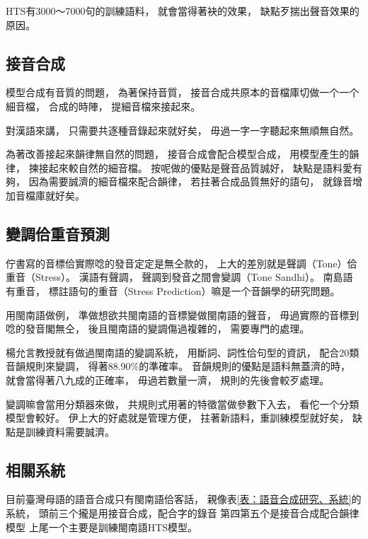 HTS有3000～7000句的訓練語料，
就會當得著袂的效果，
缺點歹揣出聲音效果的原因。


\subsection{接音合成}
\label{小節：接音合成}
模型合成有音質的問題，
為著保持音質，
接音合成共原本的音檔庫切做一个一个細音檔，
合成的時陣，
提細音檔來接起來。

對漢語來講，
只需要共逐種音錄起來就好矣，
毋過一字一字聽起來無順無自然。

為著改善接起來韻律無自然的問題，
接音合成會配合模型合成，
用模型產生的韻律，
揀接起來較自然的細音檔。
按呢做的優點是聲音品質誠好，
缺點是語料愛有夠，
因為需要誠濟的細音檔來配合韻律，
若拄著合成品質無好的語句，
就錄音增加音檔庫就好矣。

\subsection{變調佮重音預測}
\label{小節：變調佮重音預測}
佇書寫的音標佮實際唸的發音定定是無仝款的，
上大的差別就是聲調（Tone）佮重音（Stress）。
漢語有聲調，
聲調到發音之間會變調（Tone Sandhi）。
南島語有重音，
標註語句的重音（Stress Prediction）嘛是一个音韻學的研究問題。

用閩南語做例，
準做想欲共閩南語的音標變做閩南語的聲音，
毋過實際的音標到唸的發音閣無仝，
後且閩南語的變調傷過複雜的，
需要專門的處理。

楊允言教授就有做過閩南語的變調系統\cite{iunn:台語變調系統實作研究}，
用斷詞、詞性佮句型的資訊，
配合20類音韻規則來變調，
得著88.90\%的準確率。
音韻規則的優點是語料無蓋濟的時，
就會當得著八九成的正確率，
毋過若數量一濟，
規則的先後會較歹處理。

變調嘛會當用分類器來做，
共規則式用著的特徵當做參數下入去，
看佗一个分類模型會較好。
伊上大的好處就是管理方便，
拄著新語料，重訓練模型就好矣，
缺點是訓練資料需要誠濟。

\subsection{相關系統}
\label{小節：語音合成相關系統}
目前臺灣母語的語音合成只有閩南語佮客話，
親像表\ref{表：語音合成研究、系統}的系統，
頭前三个攏是用接音合成，配合字的錄音
第四第五个是接音合成配合韻律模型
上尾一个主要是訓練閩南語HTS模型。

